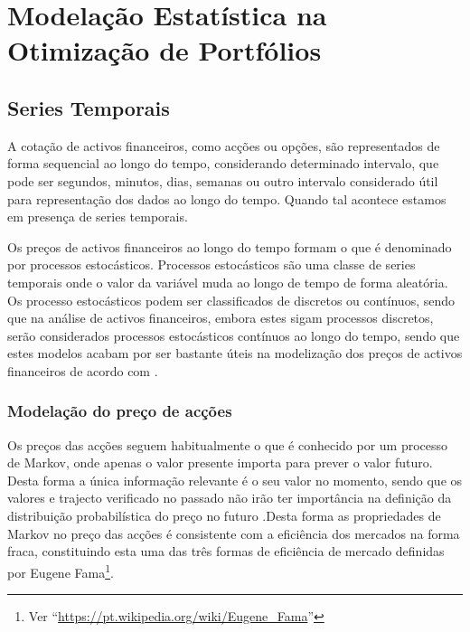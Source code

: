 \documentclass[
  12pt,
  a4paper,
  openany]{book}
\begin{document}
\begingroup
\titleformat{\chapter}[display]
{\normalfont\huge\bfseries\centering}{\chaptertitlename\ \thechapter}{20pt}{\Huge}

\hypertarget{modelauxe7uxe3o-estatuxedstica-na-otimizauxe7uxe3o-de-portfuxf3lios}{%
\chapter{Modelação Estatística na Otimização de Portfólios}\label{modelauxe7uxe3o-estatuxedstica-na-otimizauxe7uxe3o-de-portfuxf3lios}}

\newpage

\hypertarget{series-temporais}{%
\section{Series Temporais}\label{series-temporais}}

A cotação de activos financeiros, como acções ou opções, são representados de forma sequencial ao longo do tempo, considerando determinado intervalo, que pode ser segundos, minutos, dias, semanas ou outro intervalo considerado útil para representação dos dados ao longo do tempo. Quando tal acontece estamos em presença de series temporais.

Os preços de activos financeiros ao longo do tempo formam o que é denominado por processos estocásticos. Processos estocásticos são uma classe de series temporais onde o valor da variável muda ao longo de tempo de forma aleatória. Os processo estocásticos podem ser classificados de discretos ou contínuos, sendo que na análise de activos financeiros, embora estes sigam processos discretos, serão considerados processos estocásticos contínuos ao longo do tempo, sendo que estes modelos acabam por ser bastante úteis na modelização dos preços de activos financeiros de acordo com \citet{Hull2018}.

\hypertarget{modelauxe7uxe3o-do-preuxe7o-de-acuxe7uxf5es}{%
\subsection{Modelação do preço de acções}\label{modelauxe7uxe3o-do-preuxe7o-de-acuxe7uxf5es}}

Os preços das acções seguem habitualmente o que é conhecido por um processo de Markov, onde apenas o valor presente importa para prever o valor futuro. Desta forma a única informação relevante é o seu valor no momento, sendo que os valores e trajecto verificado no passado não irão ter importância na definição da distribuição probabilística do preço no futuro \citep{Hull2018}.Desta forma as propriedades de Markov no preço das acções é consistente com a eficiência dos mercados na forma fraca, constituindo esta uma das três formas de eficiência de mercado definidas por Eugene Fama\footnote{Ver ``\url{https://pt.wikipedia.org/wiki/Eugene_Fama}''}.
\end{document}
